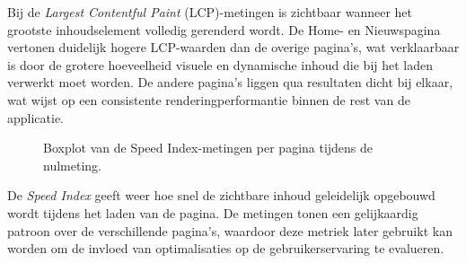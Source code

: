 Bij de \textit{Largest Contentful Paint} (LCP)-metingen is zichtbaar wanneer het grootste inhoudselement volledig gerenderd wordt. De Home- en Nieuwspagina vertonen duidelijk hogere LCP-waarden dan de overige pagina’s, wat verklaarbaar is door de grotere hoeveelheid visuele en dynamische inhoud die bij het laden verwerkt moet worden. De andere pagina’s liggen qua resultaten dicht bij elkaar, wat wijst op een consistente renderingperformantie binnen de rest van de applicatie.

\begin{figure}[H] 
\centering
{}
\caption[Speed Index-metingen per pagina]{Boxplot van de Speed Index-metingen per pagina tijdens de nulmeting.} 
\label{fig:speed-index} 
\end{figure}

De \textit{Speed Index} geeft weer hoe snel de zichtbare inhoud geleidelijk opgebouwd wordt tijdens het laden van de pagina. De metingen tonen een gelijkaardig patroon over de verschillende pagina’s, waardoor deze metriek later gebruikt kan worden om de invloed van optimalisaties op de gebruikerservaring te evalueren.

